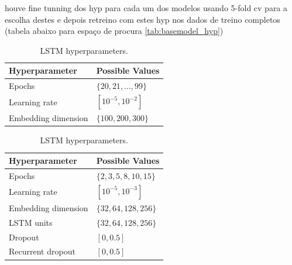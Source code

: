 \documentclass[conference]{IEEEtran}
\begin{document}
houve fine tunning dos hyp para cada um dos modelos usando 5-fold cv para a escolha destes e depois retreino com estes hyp nos dados de treino completos (tabela abaixo para espaço de procura \ref{tab:basemodel_hyp})

\begin{table}[H]
    \caption{Hyperparameter search space for the base models?...}
    \centering
    \label{tab:basemodel_hyp}
    \begin{subtable}[t]{0.45\textwidth}
        \centering
        \begin{tabular}{ll}
        \toprule
        \textbf{Hyperparameter} & \textbf{Possible Values} \\
        \midrule
        Epochs \phantom{abcng dimensi} & $\{20, 21, \ldots, 99\}$ \phantom{o}\\
        Learning rate           & $[10^{-5}, 10^{-2}]$ \\
        Embedding dimension     & $\{100, 200, 300\}$ \\
        \bottomrule
        \end{tabular}
        \vspace{.3em}
        \caption{fastText hyperparameters.}
        \label{parameters_basefasttext}
        \vspace{.1em}
    \end{subtable}
    \begin{subtable}[t]{0.45\textwidth}
        \centering
        \begin{tabular}{ll}
        \toprule
        \textbf{Hyperparameter} & \textbf{Possible Values} \\
        \midrule
        Epochs                  & $\{2, 3, 5, 8, 10, 15\}$ \\
        Learning rate           & $[10^{-5}, 10^{-3}]$ \\
        Embedding dimension     & $\{32, 64, 128, 256\}$ \\
        LSTM units              & $\{32, 64, 128, 256\}$ \\
        Dropout                 & $[0, 0.5]$ \\
        Recurrent dropout       & $[0, 0.5]$ \\
        \bottomrule
        \end{tabular}
        \vspace{.3em}
        \caption{LSTM hyperparameters.}
        \vspace{.1em}

\end{subtable}
\end{table}
\end{document}
